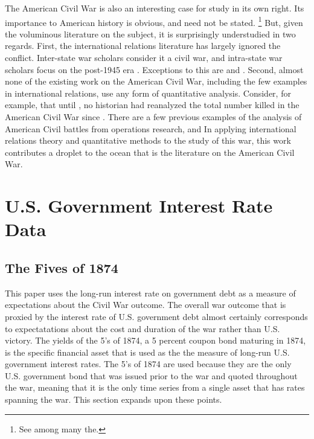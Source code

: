 The American Civil War is also an interesting case for study in its own right.
Its importance to American history is obvious, and need not be stated.%
\footnote{See \textcite{McPherson2003} among many the.}
But, given the voluminous literature on the subject, it is surprisingly understudied in two regards. %
First, the international relations literature has largely ignored the conflict.
Inter-state war scholars consider it a civil war, and intra-state war scholars focus on the post-1945 era \parencites[140-141]{Reiter2009}[2]{Poast2012}. %
Exceptions to this are \textcite{Reiter2009} and \textcite{Poast2012}.
Second, almost none of the existing work on the American Civil War, including the few examples in international relations, use any form of quantitative analysis.%
Consider, for example, that until \textcite{hacker2011census}, no historian had reanalyzed the total number killed in the American Civil War since \textcite{Livermore1900}.
There are a few previous examples of the analysis of American Civil battles from operations research, \textcite{Weiss1966} and
In applying international relations theory and quantitative methods to the study of this war, this work contributes a droplet to the ocean that is the literature on the American Civil War.



\section{U.S. Government Interest Rate Data}
\label{sec:why-prices-study}



\subsection{The Fives of 1874}
\label{sec:5s-1874}

This paper uses the long-run interest rate on government debt as a measure of expectations about the Civil War outcome.
The overall war outcome that is proxied by the interest rate of U.S. government debt almost certainly corresponds to expectatations about the cost and duration of the war rather than U.S. victory.
The yields of the 5's of 1874, a 5 percent coupon bond maturing in 1874, is the specific financial asset that is used as the the measure of long-run U.S. government interest rates.
The 5's of 1874 are used because they are the only U.S. government bond that was issued prior to the war and quoted throughout the war, meaning that it is the only time series from a single asset that has rates spanning the war.
This section expands upon these points.

